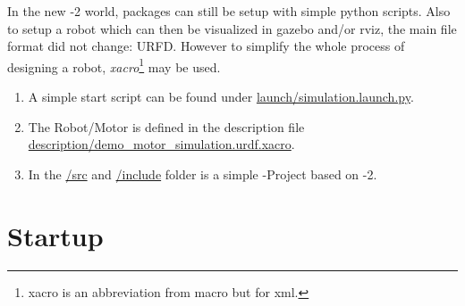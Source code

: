 
In the new -2 world, packages can still be setup with simple python scripts.
Also to setup a robot which can then be visualized in \Gls{gazebo} and/or \Gls{rviz}, the main file format did not change: URFD.
However to simplify the whole process of designing a robot, \textit{xacro}\footnote{xacro is an abbreviation from macro but for xml.} may be used.


\begin{enumerate}
    \item A simple start script can be found under \href{https://github.com/LukyLuke/mse_vt_eeros/blob/main/src/demo_package/launch/simulation.launch.py}{launch/simulation.launch.py}.

    \item The Robot/Motor is defined in the description file \\ \href{https://github.com/LukyLuke/mse_vt_eeros/blob/main/src/demo_package/description/demo_motor_simulation.urdf.xacro}{description/demo\_motor\_simulation.urdf.xacro}.

    \item In the \href{https://github.com/LukyLuke/mse_vt_eeros/tree/main/src/demo_package/src}{/src} and \href{https://github.com/LukyLuke/mse_vt_eeros/tree/main/src/demo_package/include/demo_package}{/include} folder is a simple -Project based on -2.
\end{enumerate}


\section[startup]{Startup} \label{sec:demo-startup}

